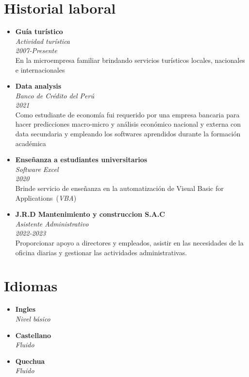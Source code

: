 \documentclass[12pt,oneside,titlepage,a4paper]{article}
\begin{document}
\begin{tcolorbox}
\begin{minipage}[t]{10cm}
\begin{tcolorbox}[grow to right by=0.75cm,colframe=white,colback=white]
				\section*{Historial laboral}
				\begin{itemize}
					\item {
						\textbf{Gu\'ia tur\'istico}\\
						\emph{Actividad tur\'istica}\\
						\emph{2007-Presente}\\
						En la microempresa familiar brindando servicios tur\'isticos locales, nacionales e internacionales
					}
					\item{
						\textbf{Data analysis}\\
						\emph{Banco de Cr\'edito del Per\'u}\\
						\emph{2021}\\
						Como estudiante de econom\'ia fui requerido por una empresa bancaria para hacer predicciones macro-micro y an\'alisis econ\'omico nacional y externa con data secundaria y empleando los softwares aprendidos durante la formaci\'on acad\'emica
					}
					\item{
						\textbf{Ense\~nanza a estudiantes universitarios}\\
						\emph{Software Excel}\\
						\emph{2020}\\
						Brinde servicio de ense\~nanza en la automatizaci\'on de Visual Basic for Applications~(\textit{VBA})
					}
					\item{
						\textbf{J.R.D Mantenimiento y construccion S.A.C}\\
						\emph{Asistente Administrativo}\\
						\emph{2022-2023}\\
						Proporcionar apoyo a  directores y empleados, asistir en las necesidades de la oficina diarias y gestionar las actividades administrativas.
					}
				\end{itemize}
				
				\section*{Idiomas}
				\begin{itemize}
					\item {
						\textbf{Ingles}\\
						\emph{Nivel b\'asico}
					}
					\item{
						\textbf{Castellano}\\
						\emph{Fluido}
					}
					\item{
						\textbf{Quechua}\\
						\emph{Fluido}
					}
				\end{itemize}
				
			
		\end{tcolorbox}
	\end{minipage}
\end{tcolorbox}
\end{document}
